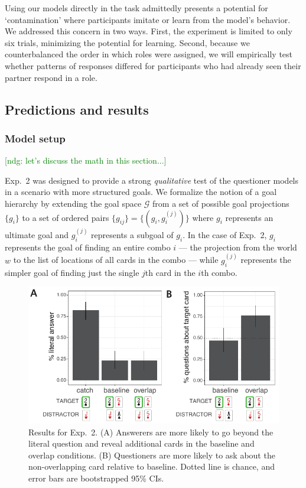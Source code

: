 \documentclass[11pt, floatsintext]{apa6}
\newcommand{\ndg}[1]{\textcolor{Green}{[ndg: #1]}}
\begin{document}
Using our models directly in the task admittedly presents a potential for `contamination' where participants imitate or learn from the model's behavior. 
We addressed this concern in two ways. 
First, the experiment is limited to only six trials, minimizing the potential for learning.
Second, because we counterbalanced the order in which roles were assigned, we will empirically test whether patterns of responses differed for participants who had already seen their partner respond in a role.

\subsection{Predictions and results}

\subsubsection{Model setup}

\ndg{let's discuss the math in this section...}

Exp.~2 was designed to provide a strong \emph{qualitative} test of the questioner models in a scenario with more structured goals.
We formalize the notion of a goal hierarchy by extending the goal space $\mathcal{G}$ from a set of possible goal projections $\{g_i\}$ to a set of ordered pairs $\{g_{ij}\} = \{(g_i, g_i^{(j)})\}$ where $g_i$ represents an ultimate goal and $g_i^{(j)}$ represents a subgoal of $g_i$. 
In the case of Exp.~2, $g_i$ represents the goal of finding an entire combo $i$ --- the projection from the world $w$ to the list of locations of all cards in the combo --- while $g_i^{(j)}$ represents the simpler goal of finding just the single $j$th card in the $i$th combo. 


\begin{figure}[th!]
\begin{center}
\includegraphics[scale = 1]{Exp2/qualitativeResults.pdf}
\end{center}
\caption{Results for Exp.~2. (A) Answerers are more likely to go beyond the literal question and reveal additional cards in the baseline and overlap conditions. (B) Questioners are more likely to ask about the non-overlapping card relative to baseline. Dotted line is chance, and error bars are bootstrapped 95\% CIs.}
\label{fig:exp2results}
\end{figure}
\end{document}
